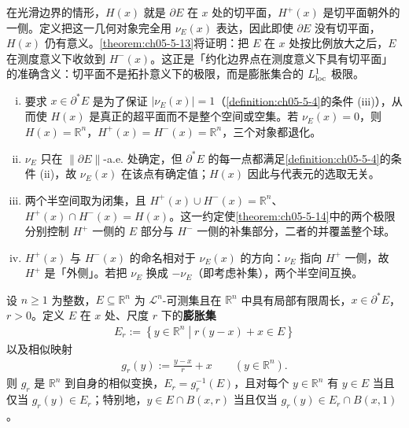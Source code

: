 \documentclass[../../main.tex]{subfiles}%
\begin{document}
\begin{remark}\label{remark:ch05-def-5-5-动机}
在光滑边界的情形，$H(x)$ 就是 $\partial E$ 在 $x$ 处的切平面，$H^+(x)$ 是切平面朝外的一侧。定义把这一几何对象完全用 $\nu_E(x)$ 表达，因此即使 $\partial E$ 没有切平面，$H(x)$ 仍有意义。\cref{theorem:ch05-5-13}将证明：把 $E$ 在 $x$ 处按比例放大之后，$E$ 在测度意义下收敛到 $H^-(x)$。这正是「约化边界点在测度意义下具有切平面」的准确含义：切平面不是拓扑意义下的极限，而是膨胀集合的 $L^1_{\mathrm{loc}}$ 极限。%
\end{remark}

\begin{remark}\label{remark:ch05-def-5-5-条件}
\begin{enumerate}[(i)]
\item 要求 $x\in\partial^*E$ 是为了保证 $\lvert\nu_E(x)\rvert=1$（\cref{definition:ch05-5-4}的条件 (iii)），从而使 $H(x)$ 是真正的超平面而不是整个空间或空集。若 $\nu_E(x)=0$，则 $H(x)=\mathbb{R}^n$，$H^+(x)=H^-(x)=\mathbb{R}^n$，三个对象都退化。%
\item $\nu_E$ 只在 $\lVert\partial E\rVert$-a.e. 处确定，但 $\partial^*E$ 的每一点都满足\cref{definition:ch05-5-4}的条件 (ii)，故 $\nu_E(x)$ 在该点有确定值；$H(x)$ 因此与代表元的选取无关。%
\item 两个半空间取为闭集，且 $H^+(x)\cup H^-(x)=\mathbb{R}^n$、$H^+(x)\cap H^-(x)=H(x)$。这一约定使\cref{theorem:ch05-5-14}中的两个极限分别控制 $H^+$ 一侧的 $E$ 部分与 $H^-$ 一侧的补集部分，二者的并覆盖整个球。%
\item $H^+(x)$ 与 $H^-(x)$ 的命名相对于 $\nu_E(x)$ 的方向：$\nu_E$ 指向 $H^+$ 一侧，故 $H^+$ 是「外侧」。若把 $\nu_E$ 换成 $-\nu_E$（即考虑补集），两个半空间互换。
\end{enumerate}
\end{remark}

\begin{definition*}[膨胀集的记号]\label{definition:ch05-def-5-5-膨胀}
设 $n\geqslant1$ 为整数，$E\subseteq\mathbb{R}^n$ 为 $\mathcal{L}^n$-可测集且在 $\mathbb{R}^n$ 中具有局部有限周长，$x\in\partial^*E$，$r>0$。定义 $E$ 在 $x$ 处、尺度 $r$ 下的\textbf{膨胀集}
\begin{align*}
E_r:=\left\{y\in\mathbb{R}^n\middle|r(y-x)+x\in E\right\}
\end{align*}
以及相似映射
\begin{align*}
g_r(y):=\frac{y-x}{r}+x\qquad(y\in\mathbb{R}^n).
\end{align*}
则 $g_r$ 是 $\mathbb{R}^n$ 到自身的相似变换，$E_r=g_r^{-1}(E)$，且对每个 $y\in\mathbb{R}^n$ 有 $y\in E$ 当且仅当 $g_r(y)\in E_r$；特别地，$y\in E\cap B(x,r)$ 当且仅当 $g_r(y)\in E_r\cap B(x,1)$。
\end{definition*}
\end{document}
